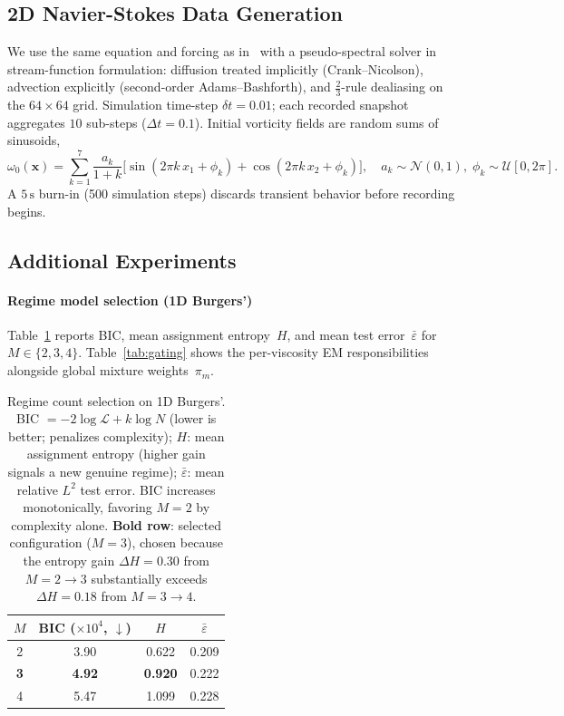 \documentclass[preprint,10pt]{elsarticle}
\begin{document}
\subsection{2D Navier-Stokes Data Generation}\label{app:ns_data}

We use the same equation and forcing as in~\cite{Li2021} with a
pseudo-spectral solver in stream-function formulation: diffusion treated
implicitly (Crank--Nicolson), advection explicitly (second-order
Adams--Bashforth), and $\tfrac{2}{3}$-rule dealiasing on the $64{\times}64$
grid. Simulation time-step $\delta t{=}0.01$; each recorded snapshot
aggregates $10$ sub-steps ($\Delta t{=}0.1$). Initial vorticity fields are
random sums of sinusoids,
\[
  \omega_0(\mathbf{x}) = \sum_{k=1}^{7}\frac{a_k}{1{+}k}
  \bigl[\sin(2\pi k\,x_1+\phi_k)+\cos(2\pi k\,x_2+\phi_k)\bigr],
  \quad a_k\sim\mathcal{N}(0,1),\;\phi_k\sim\mathcal{U}[0,2\pi].
\]
A $5\,\mathrm{s}$ burn-in (500 simulation steps) discards transient
behavior before recording begins.

\subsection{Additional Experiments}\label{app:exp}

\paragraph{Regime model selection (1D Burgers')}
Table~\ref{tab:regime_selection} reports BIC, mean assignment entropy~$H$,
and mean test error~$\bar{\varepsilon}$ for $M\in\{2,3,4\}$.
Table~\ref{tab:gating} shows the per-viscosity EM responsibilities alongside
global mixture weights~$\pi_m$.

\begin{table}[h]
\centering
\small
\setlength{\tabcolsep}{12pt}
\caption{Regime count selection on 1D Burgers'.
  BIC $= {-2\log\mathcal{L} + k\log N}$ (lower is better; penalizes complexity);
  $H$: mean assignment entropy (higher gain signals a new genuine regime);
  $\bar{\varepsilon}$: mean relative $L^2$ test error.
  BIC increases monotonically, favoring $M{=}2$ by complexity alone.
  \textbf{Bold row}: selected configuration ($M{=}3$), chosen because the entropy
  gain $\Delta H{=}0.30$ from $M{=}2{\to}3$ substantially exceeds $\Delta H{=}0.18$
  from $M{=}3{\to}4$.}
\label{tab:regime_selection}
\begin{tabular}{c c c c}
\toprule
$M$ & BIC (${\times}10^{4}$, $\downarrow$) & $H$ & $\bar{\varepsilon}$ \\
\midrule
2          & 3.90 & 0.622 & 0.209 \\
\textbf{3} & \textbf{4.92} & \textbf{0.920} & 0.222 \\
4          & 5.47 & 1.099 & 0.228 \\
\bottomrule
\end{tabular}
\end{table}
\end{document}
